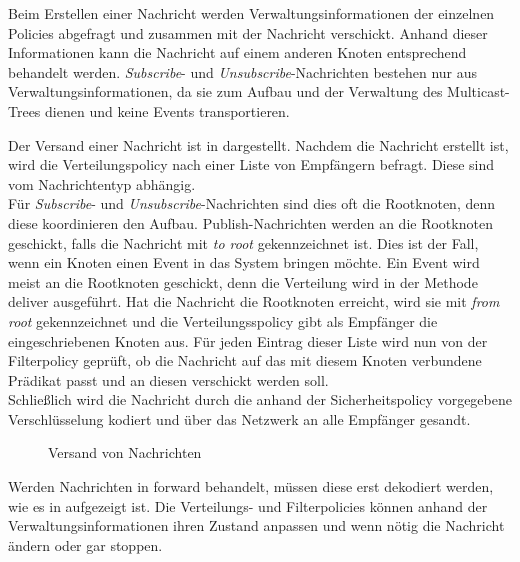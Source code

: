 Beim Erstellen einer Nachricht werden Verwaltungsinformationen der einzelnen Policies abgefragt und zusammen mit der Nachricht verschickt. Anhand dieser Informationen kann die Nachricht auf einem anderen Knoten entsprechend behandelt werden. \emph{Subscribe}- und \emph{Unsubscribe}-Nachrichten bestehen nur aus Verwaltungsinformationen, da sie zum Aufbau und der Verwaltung des Multicast-Trees dienen und keine Events transportieren.

Der Versand einer Nachricht ist in  dargestellt. Nachdem die Nachricht erstellt ist, wird die Verteilungspolicy nach einer Liste von Empfängern befragt. Diese sind vom Nachrichtentyp abhängig.\\
Für \emph{Subscribe}- und \emph{Unsubscribe}-Nachrichten sind dies oft die Rootknoten, denn diese koordinieren den Aufbau. Publish-Nachrichten werden an die Rootknoten geschickt, falls die Nachricht mit \emph{to root} gekennzeichnet ist. Dies ist der Fall, wenn ein Knoten einen Event in das System bringen möchte. Ein Event wird meist an die Rootknoten geschickt, denn die Verteilung wird in der Methode deliver ausgeführt. Hat die Nachricht die Rootknoten erreicht, wird sie mit \emph{from root} gekennzeichnet und die Verteilungsspolicy gibt als Empfänger die eingeschriebenen Knoten aus. Für jeden Eintrag dieser Liste wird nun von der Filterpolicy geprüft, ob die Nachricht auf das mit diesem Knoten verbundene Prädikat passt und an diesen verschickt werden soll.\\
Schließlich wird die Nachricht durch die anhand der Sicherheitspolicy vorgegebene Verschlüsselung kodiert und über das Netzwerk an alle Empfänger gesandt.

\begin{figure}[htbp]
\centering
{}
\caption{Versand von Nachrichten}
\label{fig:processing_send}
\end{figure}

Werden Nachrichten in forward behandelt, müssen diese erst dekodiert werden, wie es in  aufgezeigt ist. Die Verteilungs- und Filterpolicies können anhand der Verwaltungsinformationen ihren Zustand anpassen und wenn nötig die Nachricht ändern oder gar stoppen.

